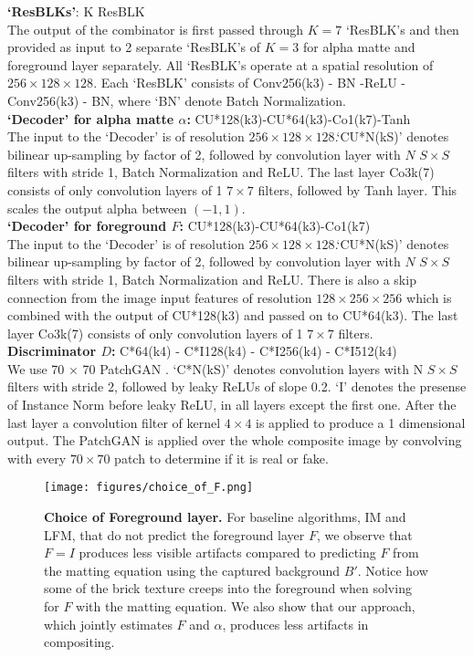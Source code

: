 \documentclass[10pt,twocolumn,letterpaper]{article}
\begin{document}
\noindent
\textbf{`ResBLKs'}: K ResBLK \\
The output of the combinator is first passed through $K=7$ `ResBLK's and then provided as input to 2 separate `ResBLK's of $K=3$ for alpha matte and foreground layer separately. All `ResBLK's operate at a spatial resolution of $256 \times 128 \times 128$. Each `ResBLK' consists of Conv256(k3) - BN -ReLU - Conv256(k3) - BN, where `BN' denote Batch Normalization.\\

\noindent
\textbf{`Decoder' for alpha matte $\alpha$:} CU*128(k3)-CU*64(k3)-Co1(k7)-Tanh\\
The input to the `Decoder' is of resolution $256 \times 128 \times 128$.`CU*N(kS)' denotes bilinear up-sampling by factor of 2, followed by convolution layer with $N$ $S \times S$ filters with stride 1, Batch Normalization and ReLU. The last layer Co3k(7) consists of only convolution layers of 1 $7\times7$ filters, followed by Tanh layer. This scales the output alpha between $(-1,1)$.\\

\noindent
\textbf{`Decoder' for foreground $F$:} CU*128(k3)-CU*64(k3)-Co1(k7)\\
The input to the `Decoder' is of resolution $256 \times 128 \times 128$.`CU*N(kS)' denotes bilinear up-sampling by factor of 2, followed by convolution layer with $N$ $S \times S$ filters with stride 1, Batch Normalization and ReLU. There is also a skip connection from the image input features of resolution $128 \times 256 \times 256$ which is combined with the output of CU*128(k3) and passed on to CU*64(k3). The last layer Co3k(7) consists of only convolution layers of 1 $7\times7$ filters.\\

\noindent
\textbf{Discriminator $D$: } C*64(k4) - C*I128(k4) - C*I256(k4) - C*I512(k4)\\
We use 70 × 70 PatchGAN \cite{isola2017image}. `C*N(kS)' denotes convolution layers with N $S \times S$ filters with stride 2, followed by leaky ReLUs of slope 0.2. `I' denotes the presense of Instance Norm before leaky ReLU, in all layers except the first one. After the last layer a convolution filter of kernel $4 \times 4$ is applied to produce a 1 dimensional output. The PatchGAN is applied over the whole composite image by convolving with every $70 \times 70$ patch to determine if it is real or fake.

\begin{figure*}[!ht]
	\centering
	\texttt{[image: figures/choice\_of\_F.png]}    \caption{\small \textbf{Choice of Foreground layer.} For baseline algorithms, IM and LFM, that do not predict the foreground layer $F$, we observe that $F=I$ produces less visible artifacts compared to predicting $F$ from the matting equation using the captured background $B'$. Notice how some of the brick texture creeps into the foreground when solving for $F$ with the matting equation.  We also show that our approach, which jointly estimates $F$ and $\alpha$, produces less artifacts in compositing.} 
\label{fig:choiceF}
\end{figure*}
\end{document}
